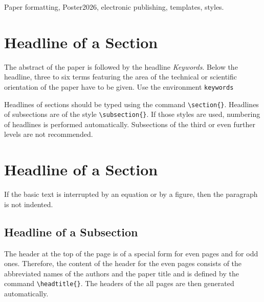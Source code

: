 \documentclass{poster26}
\begin{document}
\begin{keywords}
Paper formatting, Poster2026, electronic publishing, templates, styles.
\end{keywords}


\section{Headline of a Section}
The abstract of the paper is followed by the headline \emph{Keywords}. Below the headline, three to six terms featuring the area of the technical or scientific orientation of the paper have to be given. Use the environment \verb+keywords+
 
Headlines of sections should be typed using the command \verb+\section{}+. Headlines of subsections are of the style \verb+\subsection{}+. If those styles are used, numbering of headlines is performed automatically. Subsections of the third or even further levels are not recommended.

\section{Headline of a Section}
If the basic text is interrupted by an equation or by a figure, then the paragraph is not indented.

\subsection{Headline of a Subsection}
The header at the top of the page is of a special form for even pages and for odd ones. Therefore, the content of the header for the even pages consists of the abbreviated names of the authors and the paper title and is defined by the command \verb+\headtitle{}+. The headers of the all pages are then generated automatically.
\end{document}
